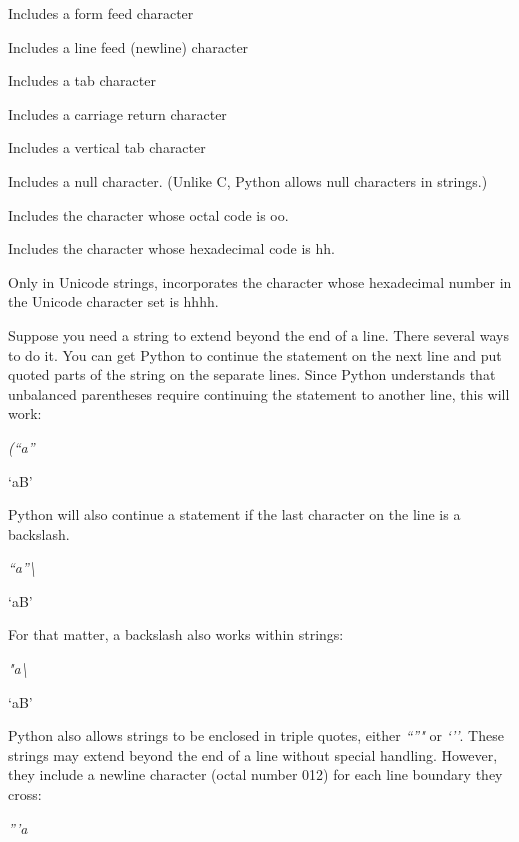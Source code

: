 Includes a form feed character



Includes a line feed (newline)
character



Includes a tab character



Includes a carriage return
character



Includes a vertical tab character



Includes a null character. (Unlike
C, Python allows null characters in strings.)



Includes the character whose octal
code is oo.



Includes the character whose
hexadecimal code is hh.



Only in Unicode strings,
incorporates the character whose hexadecimal number in the Unicode
character set is hhhh.

Suppose you need a string to extend
beyond the end of a line. There several ways to do it. You can get
Python to continue the statement on the next line and put quoted parts
of the string on the separate lines. Since Python understands that
unbalanced parentheses require continuing the statement to another line,
this will work:


\emph{(``a''}



`aB'

Python will also continue a
statement if the last character on the line is a backslash.


\emph{``a''\textbackslash{}}



`aB'

For that matter, a backslash also
works within strings:


\emph{"a\textbackslash{}}



`aB'

Python also allows strings to be
enclosed in triple quotes, either \emph{``''"} or \emph{`''}. These
strings may extend beyond the end of a line without special handling.
However, they include a newline character (octal number 012) for each
line boundary they cross:


\emph{'''a}




